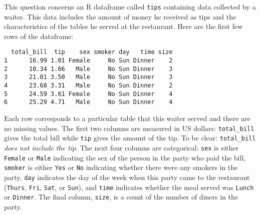 \documentclass[addpoints,12pt]{exam}
\begin{document}
\begin{questions}
  \question This question concerns an R dataframe called \texttt{tips} containing data collected by a waiter. This data includes the amount of money he received as tips and the characteristics of the tables he served at the restaurant. 
  Here are the first few rows of the dataframe:
  \begin{verbatim}
  total_bill  tip    sex smoker day   time size
1      16.99 1.01 Female     No Sun Dinner    2
2      10.34 1.66   Male     No Sun Dinner    3
3      21.01 3.50   Male     No Sun Dinner    3
4      23.68 3.31   Male     No Sun Dinner    2
5      24.59 3.61 Female     No Sun Dinner    4
6      25.29 4.71   Male     No Sun Dinner    4
  \end{verbatim}
  Each row corresponds to a particular table that this waiter served and there are no missing values.
  The first two columns are measured in US dollars: \texttt{total\_bill} gives the total bill while \texttt{tip} gives the amount of the tip.
  To be clear: \texttt{total\_bill} \emph{does not include the tip}.
  The next four columns are categorical: \texttt{sex} is either \texttt{Female} or \texttt{Male} indicating the sex of the person in the party who paid the bill, \texttt{smoker} is either \texttt{Yes} or \texttt{No} indicating whether there were any smokers in the party, \texttt{day} indicates the day of the week when this party came to the restaurant (\texttt{Thurs}, \texttt{Fri}, \texttt{Sat}, or \texttt{Sun}), and \texttt{time} indicates whether the meal served was \texttt{Lunch} or \texttt{Dinner}.
  The final column, \texttt{size}, is a count of the number of diners in the party.
\end{questions}
\end{document}
